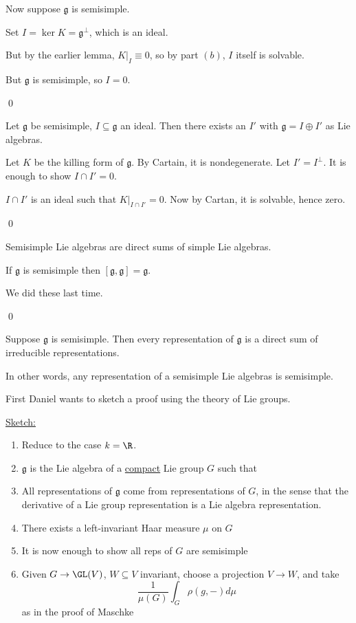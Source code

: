 \documentclass[x11names,reqno,14pt]{extarticle}
\newcommand{\mk}[1]{\mathfrak{#1}}
\newcommand{\g}{\mk{g}}
\begin{document}
Now suppose $\g$ is semisimple. 

Set $I = \ker K = \g^\perp$, which is an ideal. 

But by the earlier lemma, $K|_I \equiv 0$, so by part $(b)$, $I$ itself is solvable.

But $\g$ is semisimple, so $I = 0$. 

\qed


\thm

Let $\g$ be semisimple, $I\subseteq\g$ an ideal. Then there exists an $I'$ with $\g = I \oplus I'$ as Lie algebras. 

\proof

Let $K$ be the killing form of $\g$. By Cartain, it is nondegenerate. Let $I' = I^\perp$. It is enough to show $I\cap I' = 0$.

$I \cap I'$ is an ideal such that $K|_{I\cap I'} = 0$. Now by Cartan, it is solvable, hence zero. 

\qed

\cor

Semisimple Lie algebras are direct sums of simple Lie algebras.

\cor

If $\g$ is semisimple then $[\g,\g]=\g$. 

\proof

We did these last time. 

\qed

\thm

Suppose $\g$ is semisimple. Then every representation of $\g$ is a direct sum of irreducible representations. 

In other words, any representation of a semisimple Lie algebras is semisimple. 

\proof

First Daniel wants to sketch a proof using the theory of Lie groups. 

\underline{Sketch:} 

\begin{enumerate}

\item Reduce to the case $k = \R$. 

\item $\g$ is the Lie algebra of a \underline{compact} Lie group $G$ such that

\item All representations of $\g$ come from representations of $G$, in the sense that the derivative of a Lie group representation is a Lie algebra representation. 

\item There exists a left-invariant Haar measure $\mu$ on $G$

\item It is now enough to show all reps of $G$ are semisimple

\item Given $G\to\GL(V)$, $W\subseteq V$ invariant, choose a projection $V\to W$, and take
\[
\frac{1}{\mu(G)}\int_G\rho(g,-)d\mu
\]
as in the proof of Maschke

\end{enumerate}
\end{document}
